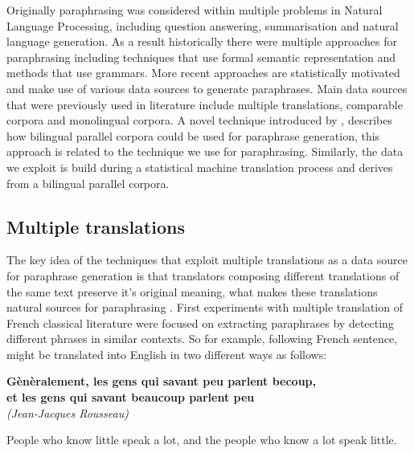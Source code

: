 Originally paraphrasing was considered within multiple problems in Natural Language Processing, including question answering, summarisation and natural language generation. As a result historically there were multiple approaches for paraphrasing including techniques that use formal semantic representation and methods that use grammars. More recent approaches are statistically motivated and make use of various data sources to generate paraphrases. 
Main data sources that were previously used in literature include multiple translations, comparable corpora and monolingual corpora. A novel technique introduced by \cite{Callison-Burch2007}, describes how bilingual parallel corpora could be used for paraphrase generation, this approach is related to the technique we use for paraphrasing. Similarly, the data we exploit is build during a statistical machine translation process and derives from a bilingual parallel corpora.

\subsection{Multiple translations}

The key idea of the techniques that exploit multiple translations as a data source for paraphrase generation is that translators composing different translations of the same text preserve it's original meaning, what makes these translations natural sources for paraphrasing \cite{barzilay2001extracting}. First experiments with multiple translation of French classical literature were focused on extracting paraphrases by detecting different phrases in similar contexts. So for example, following French sentence, might be translated into English in two different ways as follows:

\begin{center}
\begin{Large}
\textbf{G\`{e}n\`{e}ralement, les gens qui savant peu parlent becoup,\\ et les gens qui savant beaucoup parlent peu}
\\
\small{\textit{(Jean-Jacques Rousseau)}}
\end{Large}
\end{center}

\begin{center}
\begin{Large}
People who know little speak a lot, and the people who know a lot speak little. 
\end{Large}
\end{center}

